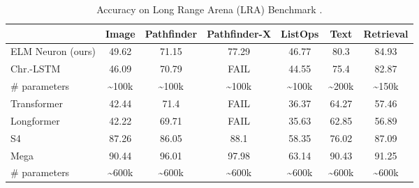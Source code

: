 \documentclass{article} \usepackage{iclr2024_doc_style,times}
\begin{document}
\begin{table}
    \centering
    \begin{minipage}{0.99\linewidth}
        \centering
        \begin{minipage}[c]{0.99\linewidth}
            \setlength{\tabcolsep}{2pt}
            \caption{Accuracy on Long Range Arena (LRA) Benchmark \cite{tay2021long}.}
            \centering
            \begin{tabular}{lcccccc}
              \toprule
              & Image & Pathfinder & Pathfinder-X & ListOps & Text & Retrieval \\
              \midrule
              ELM Neuron (ours) & 49.62 & 71.15 & 77.29 & 46.77 & 80.3 & 84.93 \\ 
              Chr.-LSTM \cite{tallec2018can} & 46.09 & 70.79 & \hspace{1.6mm}FAIL & 44.55 & 75.4 & 82.87 \\ 
              \textcolor{greyVar}{\# parameters} & \textcolor{greyVar}{\textasciitilde 100k} &  \textcolor{greyVar}{\textasciitilde 100k} &  \textcolor{greyVar}{\textasciitilde 100k} &  \textcolor{greyVar}{\textasciitilde 100k} &  \textcolor{greyVar}{\textasciitilde 200k} &  \textcolor{greyVar}{\textasciitilde 150k} \\ 
              \midrule
              Transformer \cite{vaswani2017attention} & 42.44 & 71.4 & FAIL & 36.37 & 64.27 & 57.46 \\
              Longformer \cite{beltagy2020longformer} & 42.22 & 69.71 & FAIL & 35.63 & 62.85 & 56.89 \\
S4 \cite{guefficiently} & 87.26 & 86.05 & 88.1 & 58.35 & 76.02 & 87.09\\
              Mega \cite{ma2023mega} & 90.44 & 96.01 & 97.98 & 63.14 & 90.43 & 91.25 \\ 
              \textcolor{greyVar}{\# parameters} &  \textcolor{greyVar}{\textasciitilde 600k} &  \textcolor{greyVar}{\textasciitilde 600k} &  \textcolor{greyVar}{\textasciitilde 600k} &  \textcolor{greyVar}{\textasciitilde 600k} &  \textcolor{greyVar}{\textasciitilde 600k} &  \textcolor{greyVar}{\textasciitilde 600k} \\
              \bottomrule
            \end{tabular}
            \label{tbl:long_sequence_modelling_results}
        \end{minipage}
        \begin{minipage}[c]{0.99\linewidth}
            \vspace{1.5em}          

\end{minipage}
\end{minipage}
\end{table}
\end{document}
